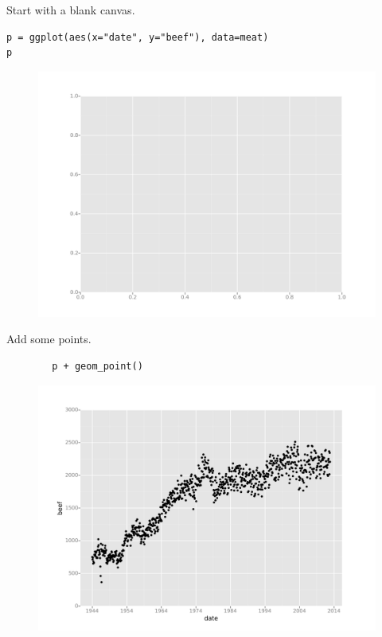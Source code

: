 \documentclass{beamer}
\begin{document}
\begin{frame}[fragile]
Start with a blank canvas.
\begin{framed}
\begin{verbatim}
p = ggplot(aes(x="date", y="beef"), data=meat)
p
\end{verbatim}
\end{framed}
\begin{figure}
\centering
\includegraphics[width=0.7\linewidth]{Layers1}
\caption{}
\label{fig:Layers1}
\end{figure}

\end{frame}
\begin{frame}[fragile]
	Add some points.
	\begin{framed}
		\begin{verbatim}
		p + geom_point()
		\end{verbatim}
	\end{framed}
	\begin{figure}
		\centering
		\includegraphics[width=0.7\linewidth]{Layers2}
			\end{figure}
	
	
\end{frame}
\end{document}
